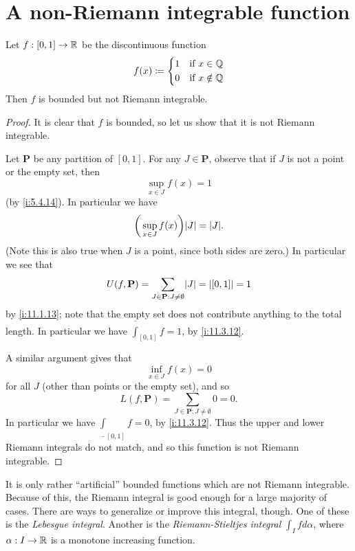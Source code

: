\section{A non-Riemann integrable function}\label{i:sec:11.7}

\begin{prop}\label{i:11.7.1}
  Let \(f : [0, 1] \to \mathbb{R}\) be the discontinuous function
  \[
    f(x) \coloneqq \begin{dcases}
      1 & \text{if } x \in \mathbb{Q}    \\
      0 & \text{if } x \notin \mathbb{Q}
    \end{dcases}
  \]
  Then \(f\) is bounded but not Riemann integrable.
\end{prop}

\begin{proof}
  It is clear that \(f\) is bounded, so let us show that it is not Riemann integrable.

  Let \(\mathbf{P}\) be any partition of \([0, 1]\).
  For any \(J \in \mathbf{P}\), observe that if \(J\) is not a point or the empty set, then
  \[
    \sup_{x \in J} f(x) = 1
  \]
  (by \cref{i:5.4.14}).
  In particular we have
  \[
    \bigg(\sup_{x \in J} f(x)\bigg) \abs{J} = \abs{J}.
  \]
  (Note this is also true when \(J\) is a point, since both sides are zero.)
  In particular we see that
  \[
    U(f, \mathbf{P}) = \sum_{J \in \mathbf{P} : J \neq \emptyset} \abs{J} = \abs{[0, 1]} = 1
  \]
  by \cref{i:11.1.13};
  note that the empty set does not contribute anything to the total length.
  In particular we have \(\overline{\int}_{[0, 1]} f = 1\), by \cref{i:11.3.12}.

  A similar argument gives that
  \[
    \inf_{x \in J} f(x) = 0
  \]
  for all \(J\) (other than points or the empty set), and so
  \[
    L(f, \mathbf{P}) = \sum_{J \in \mathbf{P} : J \neq \emptyset} 0 = 0.
  \]
  In particular we have \(\underline{\int}_{[0, 1]} f = 0\), by \cref{i:11.3.12}.
  Thus the upper and lower Riemann integrals do not match, and so this function is not Riemann integrable.
\end{proof}

\begin{rmk}\label{i:11.7.2}
  It is only rather ``artificial'' bounded functions which are not Riemann integrable.
  Because of this, the Riemann integral is good enough for a large majority of cases.
  There are ways to generalize or improve this integral, though.
  One of these is the \emph{Lebesgue integral}.
  Another is the \emph{Riemann-Stieltjes integral} \(\int_I f d\alpha\), where \(\alpha : I \to \mathbb{R}\) is a monotone increasing function.
\end{rmk}
